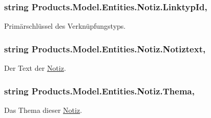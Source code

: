 \subsubsection[{\texorpdfstring{Linktyp\+Id}{LinktypId}}]{\setlength{\rightskip}{0pt plus 5cm}string Products.\+Model.\+Entities.\+Notiz.\+Linktyp\+Id\hspace{0.3cm}{\ttfamily [get]}, {\ttfamily [set]}}\hypertarget{class_products_1_1_model_1_1_entities_1_1_notiz_ab1ffa41c63b7812dd9a834341ce234b8}{}\label{class_products_1_1_model_1_1_entities_1_1_notiz_ab1ffa41c63b7812dd9a834341ce234b8}


Primärschlüssel des Verknüpfungstyps. 

\subsubsection[{\texorpdfstring{Notiztext}{Notiztext}}]{\setlength{\rightskip}{0pt plus 5cm}string Products.\+Model.\+Entities.\+Notiz.\+Notiztext\hspace{0.3cm}{\ttfamily [get]}, {\ttfamily [set]}}\hypertarget{class_products_1_1_model_1_1_entities_1_1_notiz_a7714b196daa4265a4dbeefdcb1d8c237}{}\label{class_products_1_1_model_1_1_entities_1_1_notiz_a7714b196daa4265a4dbeefdcb1d8c237}


Der Text der \hyperlink{class_products_1_1_model_1_1_entities_1_1_notiz}{Notiz}. 

\subsubsection[{\texorpdfstring{Thema}{Thema}}]{\setlength{\rightskip}{0pt plus 5cm}string Products.\+Model.\+Entities.\+Notiz.\+Thema\hspace{0.3cm}{\ttfamily [get]}, {\ttfamily [set]}}\hypertarget{class_products_1_1_model_1_1_entities_1_1_notiz_a32133706d08a49289851a6e12cce0dbf}{}\label{class_products_1_1_model_1_1_entities_1_1_notiz_a32133706d08a49289851a6e12cce0dbf}


Das Thema dieser \hyperlink{class_products_1_1_model_1_1_entities_1_1_notiz}{Notiz}. 

